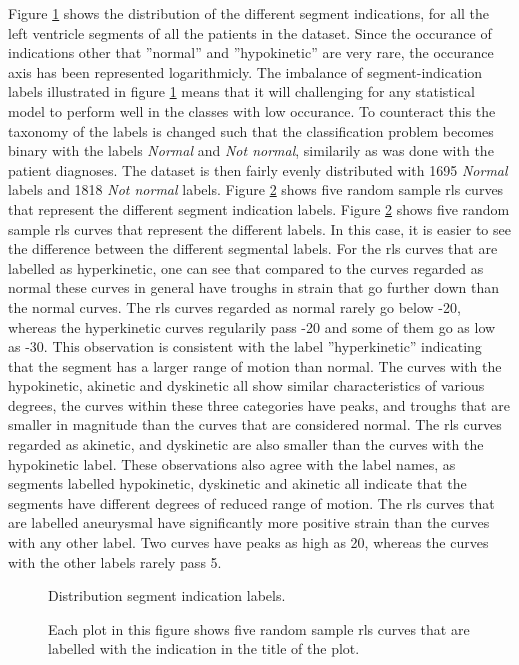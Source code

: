 Figure \ref{fig:segm_label_dist} shows the distribution of the different segment indications, for all the left ventricle segments of all the patients in the dataset. Since the occurance of indications other that ''normal'' and ''hypokinetic'' are very rare, the occurance axis has been represented logarithmicly. The imbalance of segment-indication labels illustrated in figure \ref{fig:segm_label_dist} means that it will challenging for any statistical model to perform well in the classes with low occurance. To counteract this the taxonomy of the labels is changed such that the classification problem becomes binary with the labels \textit{Normal} and \textit{Not normal}, similarily as was done with the patient diagnoses. The dataset is then fairly evenly distributed with 1695 \textit{Normal} labels and 1818 \textit{Not normal} labels. Figure \ref{fig:rls_curves_vs_segm_labels} shows five random sample \acrshort{rls} curves that represent the different segment indication labels. Figure \ref{fig:rls_curves_vs_segm_labels} shows five random sample \acrshort{rls} curves that represent the different labels. In this case, it is easier to see the difference between the different segmental labels. For the \acrshort{rls} curves that are labelled as hyperkinetic, one can see that compared to the curves regarded as normal these curves in general have troughs in strain that go further down than the normal curves. The \acrshort{rls} curves regarded as normal rarely go below -20, whereas the hyperkinetic curves regularily pass -20 and some of them go as low as -30. This observation is consistent with the label ''hyperkinetic'' indicating that the segment has a larger range of motion than normal.  The curves with the hypokinetic, akinetic and dyskinetic all show similar characteristics of various degrees, the curves within these three categories have peaks, and troughs that are smaller in magnitude than the curves that are considered normal. The \acrshort{rls} curves regarded as akinetic, and dyskinetic are also smaller than the curves with the hypokinetic label. These observations also agree with the label names, as segments labelled hypokinetic, dyskinetic and akinetic all indicate that the segments have different degrees of reduced range of motion. The \acrshort{rls} curves that are labelled aneurysmal have significantly more positive strain than the curves with any other label. Two curves have peaks as high as 20, whereas the curves with the other labels rarely pass 5.

\begin{figure}
    \centering
    
    \caption{Distribution segment indication labels.}
    \label{fig:segm_label_dist}
\end{figure}

\begin{figure}
    \centering
    
    \caption{Each plot in this figure shows five random sample \acrshort{rls} curves that are labelled with the indication in the title of the plot.}
    \label{fig:rls_curves_vs_segm_labels}
\end{figure}